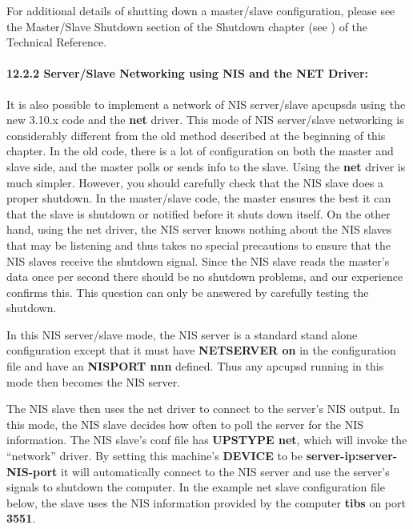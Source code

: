 For additional details of shutting down a master/slave configuration, please
see the Master/Slave Shutdown section of the Shutdown chapter (see 
) of the Technical
Reference. 

\label{Server_002fSlave-Networking-using-NIS-and-the-NET-Driver}

\paragraph*{12.2.2 Server/Slave Networking using NIS and the NET Driver:}

\label{index-NIS-networking-157}
\label{index-Net-driver-158}
It is also possible to implement a network of NIS server/slave apcupsds using
the new 3.10.x code and the {\bf net} driver. This mode of NIS server/slave
networking is considerably different from the old method described at the
beginning of this chapter. In the old code, there is a lot of configuration on
both the master and slave side, and the master polls or sends info to the
slave. Using the {\bf net} driver is much simpler. However, you should
carefully check that the NIS slave does a proper shutdown. In the master/slave
code, the master ensures the best it can that the slave is shutdown or
notified before it shuts down itself. On the other hand, using the net driver,
the NIS server knows nothing about the NIS slaves that may be listening and
thus takes no special precautions to ensure that the NIS slaves receive the
shutdown signal. Since the NIS slave reads the master's data once per second
there should be no shutdown problems, and our experience confirms this.  This
question can only be answered by carefully testing the shutdown.  

In this NIS server/slave mode, the NIS server is a standard stand alone
configuration except that it must have {\bf NETSERVER on} in the configuration
file and have an {\bf NISPORT nnn} defined. Thus any apcupsd running in this
mode then becomes the NIS server.  

The NIS slave then uses the net driver to connect to the server's NIS output.
In this mode, the NIS slave decides how often to poll the server for the NIS
information. The NIS slave's conf file has {\bf UPSTYPE net}, which will
invoke the ``network'' driver. By setting this machine's {\bf DEVICE} to be
{\bf server-ip:server-NIS-port} it will automatically connect to the NIS
server and use the server's signals to shutdown the computer.  In the example
net slave configuration file below, the slave uses the NIS information
provided by the computer {\bf tibs} on port {\bf 3551}. 


